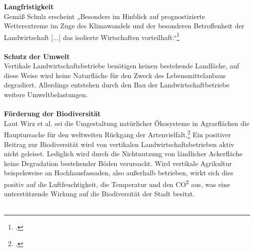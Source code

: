 \documentclass{scrartcl}
\begin{document}

\textbf{Langfristigkeit}\\
Gemäß Schulz erscheint „Besonders im Hinblick auf prognostizierte Wetterextreme im Zuge des Klimawandels und der besonderen Betroffenheit der Landwirtschaft [...] das isolierte Wirtschaften vorteilhaft.“\footcite{Schulz2013UrbaneLandmanagements}\\
\\
\textbf{Schutz der Umwelt}\\
Vertikale Landwirtschaftsbetriebe benötigen keinen bestehende Landfäche, auf diese Weise wird keine Naturfläche für den Zweck des Lebensmittelanbaus degradiert. Allerdings entstehen durch den Bau der Landwirtschaftbetriebe weitere Umweltbelastungen. \\
\\
\textbf{Förderung der Biodiversität}\\
Laut Wirz et al. sei die Umgestaltung natürlicher Ökosysteme in Agrarflächen die Hauptursache für den weltweiten Rückgang der Artenvielfalt.\footcite[S.18]{Wirz2017Okologisierte2050} Ein positiver Beitrag zur Biodiversität wird von vertikalen Landwirtschaftsbetrieben aktiv nicht geleiset. Lediglich wird durch die Nichtnutzung von ländlicher Ackerfläche keine Degradation bestehender Böden verursacht.
Wird vertikale Agrikultur beispelsweise an Hochhausfassaden, also außerhalb betrieben, wirkt sich dies positiv auf die Luftfeuchtigkeit, die Temperatur und den CO\textsuperscript{2} aus, was eine unterstützende Wirkung auf die Biodiversität der Stadt besitzt.\\
\\
\end{document}
